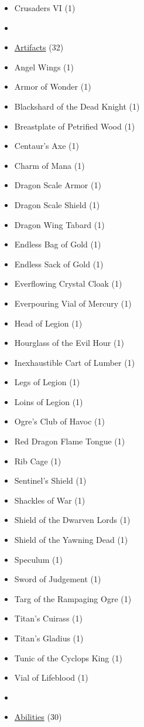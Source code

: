 \begin{multicols}{3}
\begin{itemize}[leftmargin=0pt, label={}, noitemsep, noitemsep]
  \item Crusaders VI (1)
  \item
  \item \underline{Artifacts} (32)
  \item Angel Wings (1)
  \item Armor of Wonder (1)
  \item Blackshard of the Dead Knight (1)
  \item Breastplate of Petrified Wood (1)
  \item Centaur's Axe (1)
  \item Charm of Mana (1)
  \item Dragon Scale Armor (1)
  \item Dragon Scale Shield (1)
  \item Dragon Wing Tabard (1)
  \item Endless Bag of Gold (1)
  \item Endless Sack of Gold (1)
  \item Everflowing Crystal Cloak (1)
  \item Everpouring Vial of Mercury (1)
  \item Head of Legion (1)
  \item Hourglass of the Evil Hour (1)
  \item Inexhaustible Cart of Lumber (1)
  \item Legs of Legion (1)
  \item Loins of Legion (1)
  \item Ogre's Club of Havoc (1)
  \item Red Dragon Flame Tongue (1)
  \item Rib Cage (1)
  \item Sentinel's Shield (1)
  \item Shackles of War (1)
  \item Shield of the Dwarven Lords (1)
  \item Shield of the Yawning Dead (1)
  \item Speculum (1)
  \item Sword of Judgement (1)
  \item Targ of the Rampaging Ogre (1)
  \item Titan's Cuirass (1)
  \item Titan's Gladius (1)
  \item Tunic of the Cyclops King (1)
  \item Vial of Lifeblood (1)
  \item
  \item \underline{Abilities} (30)

\end{itemize}
\end{multicols}
